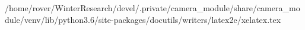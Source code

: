 /home/rover/WinterResearch/devel/.private/camera_module/share/camera_module/venv/lib/python3.6/site-packages/docutils/writers/latex2e/xelatex.tex